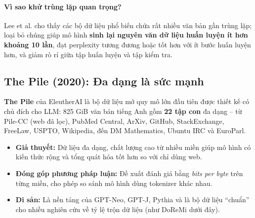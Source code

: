 \paragraph{Vì sao khử trùng lặp quan trọng?} Lee et al. \cite{lee2022dedup} cho thấy các bộ dữ liệu phổ biến chứa rất nhiều văn bản gần trùng lặp; loại bỏ chúng giúp mô hình \textbf{sinh lại nguyên văn dữ liệu huấn luyện ít hơn khoảng 10 lần}, đạt perplexity tương đương hoặc tốt hơn với ít bước huấn luyện hơn, và giảm rò rỉ giữa tập huấn luyện và tập kiểm tra.

\subsection{The Pile (2020): Đa dạng là sức mạnh}
\label{ssec:the_pile}
\textbf{The Pile} \cite{gao2020pile} của EleutherAI là bộ dữ liệu mở quy mô lớn đầu tiên được thiết kế có chủ đích cho LLM: 825 GiB văn bản tiếng Anh gồm \textbf{22 tập con} đa dạng -- từ Pile-CC (web đã lọc), PubMed Central, ArXiv, GitHub, StackExchange, FreeLaw, USPTO, Wikipedia, đến DM Mathematics, Ubuntu IRC và EuroParl.
\begin{itemize}
	\item \textbf{Giả thuyết:} Dữ liệu đa dạng, chất lượng cao từ nhiều miền giúp mô hình có kiến thức rộng và tổng quát hóa tốt hơn so với chỉ dùng web.
	\item \textbf{Đóng góp phương pháp luận:} Đề xuất đánh giá bằng \emph{bits per byte} trên từng miền, cho phép so sánh mô hình dùng tokenizer khác nhau.
	\item \textbf{Di sản:} Là nền tảng của GPT-Neo, GPT-J, Pythia và là bộ dữ liệu “chuẩn” cho nhiều nghiên cứu về tỷ lệ trộn dữ liệu (như DoReMi dưới đây).
\end{itemize}

